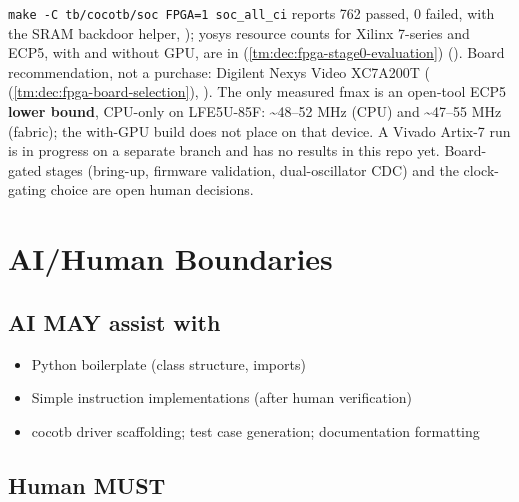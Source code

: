 \begin{record}
\begin{enumerate}
  \texttt{make\ -\allowbreak{}C\ tb/\allowbreak{}cocotb/\allowbreak{}soc\ FPGA=\allowbreak{}1\ soc\_\allowbreak{}all\_\allowbreak{}ci}
  reports 762 passed, 0 failed, with the SRAM backdoor helper, ); yosys resource counts for Xilinx 7-series and ECP5, with and
  without GPU, are in  (\cref{tm:dec:fpga-stage0-evaluation}) ().
  Board recommendation, not a purchase: Digilent Nexys Video XC7A200T
  ( (\cref{tm:dec:fpga-board-selection}), ). The only measured fmax
  is an open-tool ECP5 \textbf{lower bound}, CPU-only on LFE5U-85F:
  \textasciitilde48--52 MHz (CPU) and \textasciitilde47--55 MHz
  (fabric); the with-GPU build does not place on that device. A Vivado
  Artix-7 run is in progress on a separate branch and has no results in
  this repo yet. Board-gated stages (bring-up, firmware validation,
  dual-oscillator CDC) and the clock-gating choice are open human
  decisions.
\end{enumerate}

\end{record}


\chapter{AI/Human Boundaries}\label{cr:status:ai-human-boundaries}

\section{AI MAY assist with}\label{cr:status:ai-human-boundaries:ai-may-assist-with}

\begin{record}

\begin{itemize}
\tightlist
\item
  Python boilerplate (class structure, imports)
\item
  Simple instruction implementations (after human verification)
\item
  cocotb driver scaffolding; test case generation; documentation
  formatting
\end{itemize}

\end{record}

\section{Human MUST}\label{cr:status:ai-human-boundaries:human-must}

